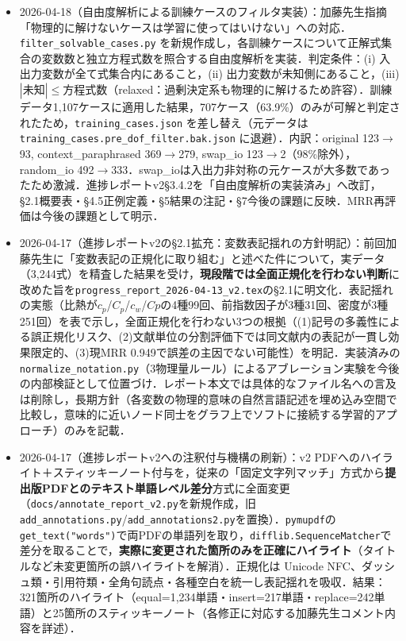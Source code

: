 \documentclass[11pt,a4paper]{jsarticle}
\begin{document}
\begin{itemize}[nosep]
  \item 2026-04-18（自由度解析による訓練ケースのフィルタ実装）：加藤先生指摘「物理的に解けないケースは学習に使ってはいけない」への対応．\texttt{filter\_solvable\_cases.py} を新規作成し，各訓練ケースについて正解式集合の変数数と独立方程式数を照合する自由度解析を実装．判定条件：(i) 入出力変数が全て式集合内にあること，(ii) 出力変数が未知側にあること，(iii) $|\text{未知}|\le$方程式数（relaxed：過剰決定系も物理的に解けるため許容）．訓練データ1{,}107ケースに適用した結果，707ケース（63.9\%）のみが可解と判定されたため，\texttt{training\_cases.json} を差し替え（元データは \texttt{training\_cases.pre\_dof\_filter.bak.json} に退避）．内訳：original 123$\to$93, context\_paraphrased 369$\to$279, swap\_io 123$\to$2（98\%除外），random\_io 492$\to$333．swap\_ioは入出力非対称の元ケースが大多数であったため激減．進捗レポートv2§3.4.2を「自由度解析の実装済み」へ改訂，§2.1概要表・§4.5正例定義・§5結果の注記・§7今後の課題に反映．MRR再評価は今後の課題として明示．

  \item 2026-04-17（進捗レポートv2の§2.1拡充：変数表記揺れの方針明記）：前回加藤先生に「変数表記の正規化に取り組む」と述べた件について，実データ（3{,}244式）を精査した結果を受け，\textbf{現段階では全面正規化を行わない判断}に改めた旨を\texttt{progress\_report\_2026-04-13\_v2.tex}の§2.1に明文化．表記揺れの実態（比熱が$c_p$/$C_p$/$c_w$/$Cp$の4種99回、前指数因子が3種31回、密度が3種251回）を表で示し，全面正規化を行わない3つの根拠（(1)記号の多義性による誤正規化リスク、(2)文献単位の分割評価下では同文献内の表記が一貫し効果限定的、(3)現MRR 0.949で誤差の主因でない可能性）を明記．実装済みの\texttt{normalize\_notation.py}（3物理量ルール）によるアブレーション実験を今後の内部検証として位置づけ．レポート本文では具体的なファイル名への言及は削除し，長期方針（各変数の物理的意味の自然言語記述を埋め込み空間で比較し，意味的に近いノード同士をグラフ上でソフトに接続する学習的アプローチ）のみを記載．

  \item 2026-04-17（進捗レポートv2への注釈付与機構の刷新）：v2 PDFへのハイライト＋スティッキーノート付与を，従来の「固定文字列マッチ」方式から\textbf{提出版PDFとのテキスト単語レベル差分}方式に全面変更（\texttt{docs/annotate\_report\_v2.py}を新規作成，旧\texttt{add\_annotations.py}/\texttt{add\_annotations2.py}を置換）．\texttt{pymupdf}の\texttt{get\_text("words")}で両PDFの単語列を取り，\texttt{difflib.SequenceMatcher}で差分を取ることで，\textbf{実際に変更された箇所のみを正確にハイライト}（タイトルなど未変更箇所の誤ハイライトを解消）．正規化は Unicode NFC、ダッシュ類・引用符類・全角句読点・各種空白を統一し表記揺れを吸収．結果：321箇所のハイライト（equal=1{,}234単語・insert=217単語・replace=242単語）と25箇所のスティッキーノート（各修正に対応する加藤先生コメント内容を詳述）．


\end{itemize}
\end{document}
